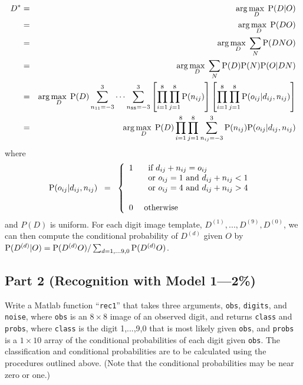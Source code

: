 \documentclass[12pt]{article}
\begin{document}
\begin{eqnarray*}
D^* & = & \arg\max_D \; {\rm P}(D|O)
\\
& = & \arg\max_D \; {\rm P}(DO)
\\
& = & \arg\max_D \; \sum_N {\rm P}(DNO)
\\
& = & \arg\max_D \; \sum_N {\rm P}(D) {\rm P}(N) {\rm P}(O|DN)
\\
& = & \arg\max_D \; {\rm P}(D) \sum_{n_{11}=-3}^3\cdots\sum_{n_{88}=-3}^3 \left[\prod_{i=1}^8\prod_{j=1}^8{\rm P}(n_{ij})\right]\left[\prod_{i=1}^8\prod_{j=1}^8{\rm P}(o_{ij}|d_{ij},n_{ij})\right]
\\
& = & \arg\max_D \; {\rm P}(D) \prod_{i=1}^8\prod_{j=1}^8 \sum_{n_{ij}=-3}^3 {\rm P}(n_{ij}){\rm P}(o_{ij}|d_{ij},n_{ij})
\end{eqnarray*}
where
\[
\PP(o_{ij}|d_{ij},n_{ij}) \;\;=\;\;\left\{
\begin{array}{ll}
1 & \begin{array}[t]{l}\mbox{ if } d_{ij}+n_{ij}=o_{ij}\\
                    \mbox{ or } o_{ij} = 1 \mbox{ and } d_{ij}+n_{ij}<1\\
                    \mbox{ or } o_{ij} = 4 \mbox{ and } d_{ij}+n_{ij}>4\\
\rule{0em}{1ex}
    \end{array}
\\
0 & \mbox{ otherwise }
\end{array}
\right.
\]
and $P(D)$ is uniform.
For each digit image template, $D^{(1)},...,D^{(9)},D^{(0)}$,
we can then compute the conditional probability of $D^{(d)}$ given
$O$ by ${\rm P}(D^{(d)}|O)={\rm P}(D^{(d)}O)/\sum_{d=1,...9,0}{\rm P}(D^{(d)}O)$.


\subsection*{Part 2 \rm(Recognition with Model 1---2\%)}

Write a Matlab function ``{\tt rec1}'' that takes three arguments,
{\tt obs}, {\tt digits}, and {\tt noise}, where {\tt obs} is
an $8\times8$ image of an observed digit,
and returns {\tt class} and {\tt probs},
where {\tt class} is the digit 1,...,9,0 that is most likely given
{\tt obs}, and {\tt probs} is a $1\times10$ array of the conditional
probabilities of each digit given {\tt obs}.
The classification and conditional probabilities are to be calculated
using the procedures outlined above.
(Note that the conditional probabilities may be near zero or one.)


\vspace*{1\baselineskip}
\end{document}
